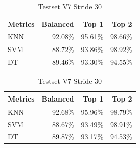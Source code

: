 \documentclass[12pt,a4paper]{article}
\begin{document}
\begin{table}[H]
    \begin{minipage}{0.55\textwidth}
        \centering
        \caption{Testset V7 Stride 15}
        \label{table:4}
        \begin{tabular}{@{}lrrr@{}}
            \toprule
            Metrics & Balanced & Top 1   & Top 2   \\
            \midrule
            KNN     & 92.08\%  & 95.61\% & 98.66\% \\
            SVM     & 88.72\%  & 93.86\% & 98.92\% \\
            DT      & 89.46\%  & 93.30\% & 94.55\% \\
            \bottomrule
        \end{tabular}
    \end{minipage}
    \begin{minipage}{0.55\textwidth}
        \centering
        \caption{Testset V7 Stride 30}
        \label{table:5}
        \begin{tabular}{@{}lrrr@{}}
            \toprule
            Metrics & Balanced & Top 1   & Top 2   \\
            \midrule
            KNN     & 92.68\%  & 95.96\% & 98.79\% \\
            SVM     & 88.67\%  & 93.49\% & 98.91\% \\
            DT      & 89.87\%  & 93.17\% & 94.53\% \\
            \bottomrule
        \end{tabular}
    \end{minipage}
\end{table}

\end{document}
